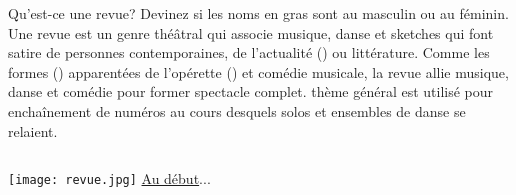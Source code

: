 \begin{frame}{Qu'est-ce une revue?}
  Devinez si les noms \alert{en gras} sont au masculin ou au féminin.\\
  \vspace{0.5cm}
  Une revue est un genre théâtral qui associe musique, danse et sketches qui font \underline{} \alert{satire} de personnes contemporaines, de l'\alert{actualité} () ou \underline{} \alert{littérature}.
  Comme les \alert{formes} (\uncover<5->{f.}) apparentées de l'\alert{opérette} () et \underline{} \alert{comédie} musicale, la revue allie musique, danse et comédie pour former \underline{} \alert{spectacle} complet.
  \underline{} \alert{thème} général est utilisé pour \underline{} \alert{enchaînement} de numéros au cours desquels solos et ensembles de danse se relaient.
  
  \vspace{0.25cm}
  \begin{columns}
      \texttt{[image: revue.jpg]}
      \raggedleft
      \hyperlink{début}{Au début}...
  \end{columns}
\end{frame}